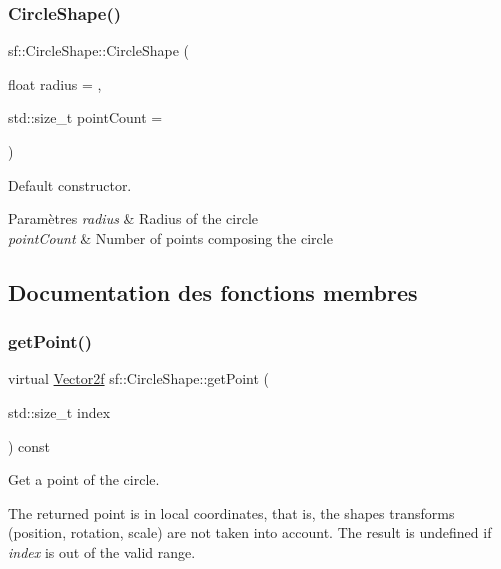 \subsubsection{\texorpdfstring{Circle\+Shape()}{CircleShape()}}
{\footnotesize\ttfamily sf\+::\+Circle\+Shape\+::\+Circle\+Shape (\begin{DoxyParamCaption}\item[{float}]{radius = {},  }\item[{std\+::size\+\_\+t}]{point\+Count = {} }\end{DoxyParamCaption})\hspace{0.3cm}{\ttfamily [explicit]}}



Default constructor. 


\begin{DoxyParams}{Paramètres}
{\em radius} & Radius of the circle \\
\hline
{\em point\+Count} & Number of points composing the circle \\
\hline
\end{DoxyParams}


\subsection{Documentation des fonctions membres}
\mbox{\label{classsf_1_1CircleShape_a2d7f9715502b960b92387102fddb8736}} 
\subsubsection{\texorpdfstring{get\+Point()}{getPoint()}}
{\footnotesize\ttfamily virtual \hyperlink{classsf_1_1Vector2}{Vector2f} sf\+::\+Circle\+Shape\+::get\+Point (\begin{DoxyParamCaption}\item[{std\+::size\+\_\+t}]{index }\end{DoxyParamCaption}) const\hspace{0.3cm}{\ttfamily [virtual]}}



Get a point of the circle. 

The returned point is in local coordinates, that is, the shape\textquotesingle{}s transforms (position, rotation, scale) are not taken into account. The result is undefined if {\itshape index} is out of the valid range.


